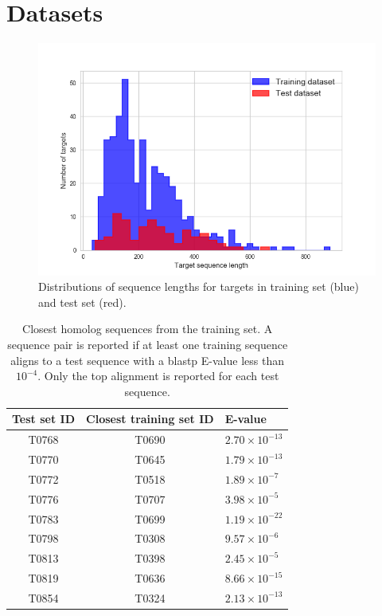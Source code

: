 \documentclass[letter,10pt]{article}
\begin{document}
\renewcommand*{\thefigure}{S\arabic{figure}}
\renewcommand*{\thetable}{S\arabic{table}}

\section{Datasets}

\begin{figure}[H]
    \centering
    \includegraphics[width=\linewidth]{Fig/datasetLengthDistributions.png}
    \caption{Distributions of sequence lengths for targets in training set (blue) and test set (red).}
    \label{Fig:dataLengthDist}
\end{figure}

\begin{table}[H]
\begin{center}
\begin{tabular}{ c | c | l }
    
    Test set ID & Closest training set ID & E-value \\
    \hline
    T0768 & T0690 & $2.70\times 10^{-13}$ \\
    T0770 & T0645 & $1.79\times 10^{-13}$ \\
    T0772 & T0518 & $1.89\times 10^{-7}$ \\
    T0776 & T0707 & $3.98\times 10^{-5}$ \\
    T0783 & T0699 & $1.19\times 10^{-22}$ \\
    T0798 & T0308 & $9.57\times 10^{-6}$ \\
    T0813 & T0398 & $2.45\times 10^{-5}$ \\
    T0819 & T0636 & $8.66\times 10^{-15}$ \\
    T0854 & T0324 & $2.13\times 10^{-13}$ \\
\end{tabular}
%   
    \caption{Closest homolog sequences from the training set. A
    sequence pair is reported if at least one training sequence aligns
    to a test sequence with a blastp E-value less than $10^{-4}$. Only
    the top alignment is reported for each test sequence.}
%
\label{Tbl:datasetsSimilarity}
\end{center}
\end{table}
\end{document}

